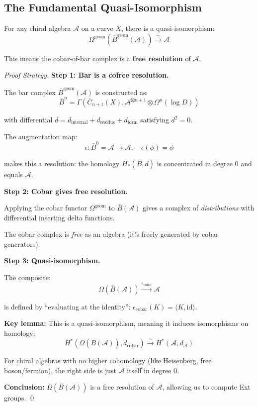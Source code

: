 \subsection{The Fundamental Quasi-Isomorphism}

\begin{theorem}\label{thm:bar-cobar-resolution}
For any chiral algebra $\mathcal{A}$ on a curve $X$, there is a quasi-isomorphism:
$$\Omega^{\text{geom}}(\bar{B}^{\text{geom}}(\mathcal{A})) \xrightarrow{\sim} \mathcal{A}$$

This means the cobar-of-bar complex is a \textbf{free resolution} of $\mathcal{A}$.
\end{theorem}

\begin{proof}[Proof Strategy]
\textbf{Step 1: Bar is a cofree resolution.}

The bar complex $\bar{B}^{\text{geom}}(\mathcal{A})$ is constructed as:
$$\bar{B}^n = \Gamma(\overline{C}_{n+1}(X), \mathcal{A}^{\boxtimes n+1} \otimes \Omega^n(\log D))$$

with differential $d = d_{\text{internal}} + d_{\text{residue}} + d_{\text{form}}$
satisfying $d^2 = 0$.

The augmentation map:
$$\epsilon: \bar{B}^0 = \mathcal{A} \to \mathcal{A}, \quad \epsilon(\phi) = \phi$$

makes this a resolution: the homology $H_*(\bar{B}, d)$ is concentrated in degree 0 and
equals $\mathcal{A}$.

\textbf{Step 2: Cobar gives free resolution.}

Applying the cobar functor $\Omega^{\text{geom}}$ to $\bar{B}(\mathcal{A})$
gives a complex of \emph{distributions} with differential inserting delta functions.

The cobar complex is \emph{free} as an algebra (it's freely generated by cobar generators).

\textbf{Step 3: Quasi-isomorphism.}

The composite:
$$\Omega(\bar{B}(\mathcal{A})) \xrightarrow{\epsilon_{\text{cobar}}} \mathcal{A}$$

is defined by ``evaluating at the identity'': $\epsilon_{\text{cobar}}(K) = \langle K, \text{id} \rangle$.

\textbf{Key lemma:} This is a quasi-isomorphism, meaning it induces isomorphisms on homology:
$$H^*(\Omega(\bar{B}(\mathcal{A})), d_{\text{cobar}}) \xrightarrow{\sim} H^*(\mathcal{A}, d_{\mathcal{A}})$$

For chiral algebras with no higher cohomology (like Heisenberg, free boson/fermion), the
right side is just $\mathcal{A}$ itself in degree 0.

\textbf{Conclusion:} $\Omega(\bar{B}(\mathcal{A}))$ is a free resolution of $\mathcal{A}$,
allowing us to compute Ext groups.
\qed
\end{proof}

